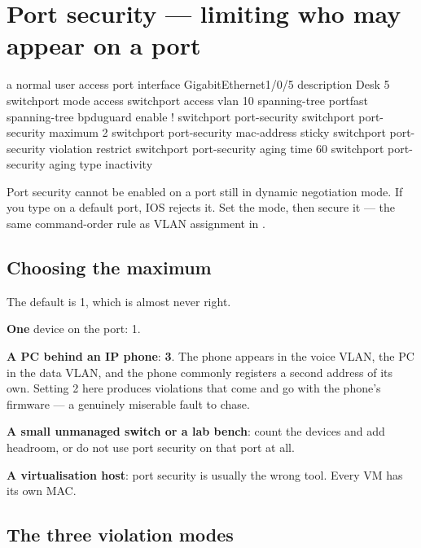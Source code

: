 \section{Port security --- limiting who may appear on a port}

\begin{config}{a normal user access port}
interface GigabitEthernet1/0/5
 description Desk 5
 switchport mode access
 switchport access vlan 10
 spanning-tree portfast
 spanning-tree bpduguard enable
!
 switchport port-security
 switchport port-security maximum 2
 switchport port-security mac-address sticky
 switchport port-security violation restrict
 switchport port-security aging time 60
 switchport port-security aging type inactivity
\end{config}

\begin{alertbox}
Port security cannot be enabled on a port still in dynamic negotiation mode. If
you type  on a default port, IOS rejects it. Set
the mode, then secure it --- the same command-order rule as VLAN assignment in
.
\end{alertbox}

\subsection{Choosing the maximum}

The default is 1, which is almost never right.

\begin{tight}
  \item \textbf{One} device on the port: 1.
  \item \textbf{A PC behind an IP phone}: \textbf{3}. The phone appears in the
        voice VLAN, the PC in the data VLAN, and the phone commonly registers a
        second address of its own. Setting 2 here produces violations that come
        and go with the phone's firmware --- a genuinely miserable fault to
        chase.
  \item \textbf{A small unmanaged switch or a lab bench}: count the devices and
        add headroom, or do not use port security on that port at all.
  \item \textbf{A virtualisation host}: port security is usually the wrong tool.
        Every VM has its own MAC.
\end{tight}

\subsection{The three violation modes}

